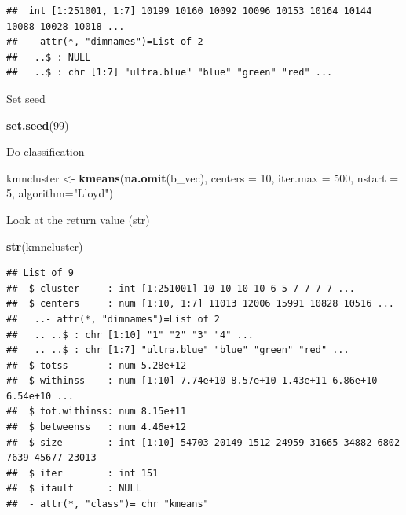 \documentclass[]{article}
\newenvironment{Shaded}{\begin{snugshade}}{\end{snugshade}}
\newcommand{\DataTypeTok}[1]{\textcolor[rgb]{0.13,0.29,0.53}{#1}}
\newcommand{\DecValTok}[1]{\textcolor[rgb]{0.00,0.00,0.81}{#1}}
\newcommand{\KeywordTok}[1]{\textcolor[rgb]{0.13,0.29,0.53}{\textbf{#1}}}
\newcommand{\NormalTok}[1]{#1}
\newcommand{\OperatorTok}[1]{\textcolor[rgb]{0.81,0.36,0.00}{\textbf{#1}}}
\newcommand{\StringTok}[1]{\textcolor[rgb]{0.31,0.60,0.02}{#1}}
\begin{document}
\begin{verbatim}
##  int [1:251001, 1:7] 10199 10160 10092 10096 10153 10164 10144 10088 10028 10018 ...
##  - attr(*, "dimnames")=List of 2
##   ..$ : NULL
##   ..$ : chr [1:7] "ultra.blue" "blue" "green" "red" ...
\end{verbatim}

Set seed

\begin{Shaded}
\begin{Highlighting}[]
\KeywordTok{set.seed}\NormalTok{(}\DecValTok{99}\NormalTok{)}
\end{Highlighting}
\end{Shaded}

Do classification

\begin{Shaded}
\begin{Highlighting}[]
\NormalTok{kmncluster <-}\StringTok{ }\KeywordTok{kmeans}\NormalTok{(}\KeywordTok{na.omit}\NormalTok{(b_vec), }\DataTypeTok{centers =} \DecValTok{10}\NormalTok{, }\DataTypeTok{iter.max =} \DecValTok{500}\NormalTok{, }\DataTypeTok{nstart =} \DecValTok{5}\NormalTok{, }\DataTypeTok{algorithm=}\StringTok{"Lloyd"}\NormalTok{)}
\end{Highlighting}
\end{Shaded}

Look at the return value (str)

\begin{Shaded}
\begin{Highlighting}[]
\KeywordTok{str}\NormalTok{(kmncluster)}
\end{Highlighting}
\end{Shaded}

\begin{verbatim}
## List of 9
##  $ cluster     : int [1:251001] 10 10 10 10 6 5 7 7 7 7 ...
##  $ centers     : num [1:10, 1:7] 11013 12006 15991 10828 10516 ...
##   ..- attr(*, "dimnames")=List of 2
##   .. ..$ : chr [1:10] "1" "2" "3" "4" ...
##   .. ..$ : chr [1:7] "ultra.blue" "blue" "green" "red" ...
##  $ totss       : num 5.28e+12
##  $ withinss    : num [1:10] 7.74e+10 8.57e+10 1.43e+11 6.86e+10 6.54e+10 ...
##  $ tot.withinss: num 8.15e+11
##  $ betweenss   : num 4.46e+12
##  $ size        : int [1:10] 54703 20149 1512 24959 31665 34882 6802 7639 45677 23013
##  $ iter        : int 151
##  $ ifault      : NULL
##  - attr(*, "class")= chr "kmeans"
\end{verbatim}

\begin{Shaded}
\end{Shaded}
\end{document}
